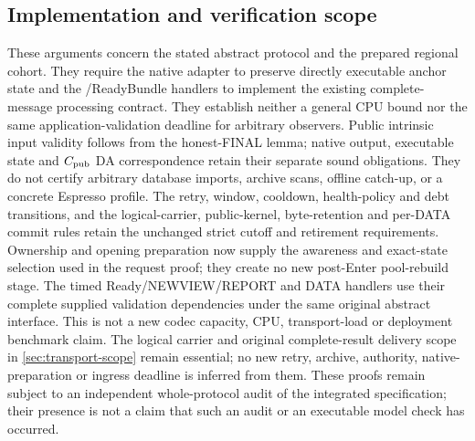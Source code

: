 \subsection{Implementation and verification scope}
\label{sec:v35-progress-scope}
These arguments concern the stated abstract protocol and the prepared
regional cohort. They require the native adapter to preserve directly
executable anchor state and the /ReadyBundle handlers
to implement the existing complete-message processing contract. They
establish neither a general CPU bound nor the same application-validation
deadline for arbitrary observers. Public intrinsic input validity follows
from the honest-FINAL lemma; native output, executable state and
$C_{\rm pub}$ DA correspondence retain their separate sound obligations.
They do not certify arbitrary database imports, archive scans, offline
catch-up, or a concrete Espresso profile.
The retry, window, cooldown, health-policy and debt transitions, and
the logical-carrier, public-kernel, byte-retention and per-DATA commit
rules retain the unchanged strict cutoff and retirement requirements.
Ownership and opening preparation now supply the awareness and
exact-state selection used in the request proof; they create no new
post-Enter pool-rebuild stage. The timed Ready/NEWVIEW/REPORT and DATA
handlers use their complete supplied validation dependencies under the
same original abstract interface. This is not a new codec capacity,
CPU, transport-load or deployment benchmark claim. The logical carrier
and original complete-result delivery scope in
\cref{sec:transport-scope} remain essential; no new retry, archive,
authority, native-preparation or ingress deadline is inferred from them.
These proofs remain subject to an independent whole-protocol audit of
the integrated specification; their presence is not a claim that such
an audit or an executable model check has occurred.
